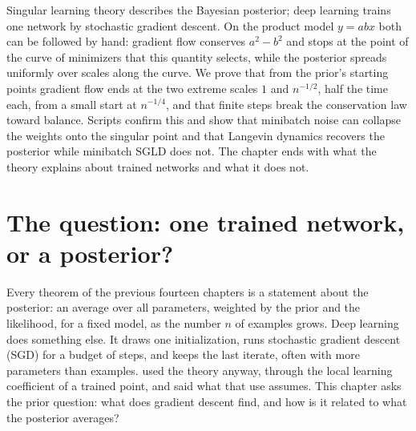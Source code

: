\newcommand{\sgdasinh}{\operatorname{arcsinh}}
\newcommand{\sgdvar}{\sigma_{xy}^2}

\begin{refsection}

\begin{chaptersummary}
Singular learning theory describes the Bayesian posterior; deep learning trains one network by stochastic gradient descent. On the product model $y=abx$ both can be followed by hand: gradient flow conserves $a^2-b^2$ and stops at the point of the curve of minimizers that this quantity selects, while the posterior spreads uniformly over scales along the curve. We prove that from the prior's starting points gradient flow ends at the two extreme scales $1$ and $n^{-1/2}$, half the time each, from a small start at $n^{-1/4}$, and that finite steps break the conservation law toward balance. Scripts confirm this and show that minibatch noise can collapse the weights onto the singular point and that Langevin dynamics recovers the posterior while minibatch SGLD does not. The chapter ends with what the theory explains about trained networks and what it does not.
\end{chaptersummary}

\section{The question: one trained network, or a posterior?}\label{sec:sgd:question}

Every theorem of the previous fourteen chapters is a statement about the posterior: an average over all parameters, weighted by the prior and the likelihood, for a fixed model, as the number $n$ of examples grows. Deep learning does something else. It draws one initialization, runs stochastic gradient descent (SGD) for a budget of steps, and keeps the last iterate, often with more parameters than examples.  used the theory anyway, through the local learning coefficient of a trained point, and said what that use assumes. This chapter asks the prior question: what does gradient descent find, and how is it related to what the posterior averages?


\end{refsection}
